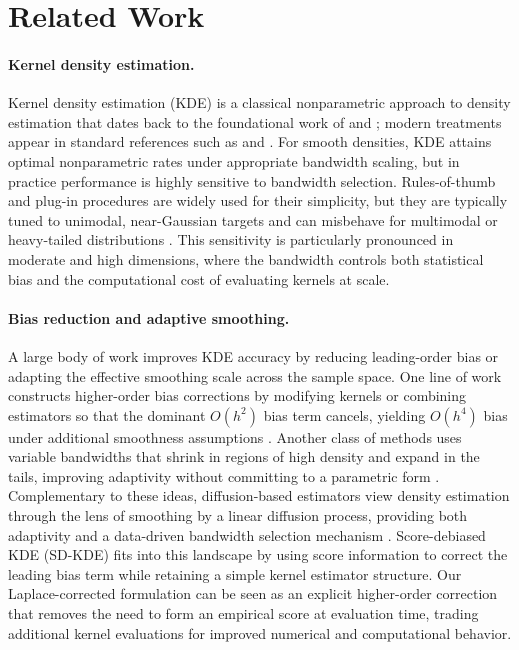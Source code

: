 \section{Related Work}
\label{sec:related}

\paragraph{Kernel density estimation.}
Kernel density estimation (KDE) is a classical nonparametric approach to density estimation that dates back to the foundational work of \citet{rosenblatt1956remarks} and \citet{parzen1962estimation}; modern treatments appear in standard references such as \citet{silverman1986density} and \citet{wand1995kernel}.
For smooth densities, KDE attains optimal nonparametric rates under appropriate bandwidth scaling, but in practice performance is highly sensitive to bandwidth selection.
Rules-of-thumb and plug-in procedures are widely used for their simplicity, but they are typically tuned to unimodal, near-Gaussian targets and can misbehave for multimodal or heavy-tailed distributions \citep{silverman1986density, botev2010diffusion}.
This sensitivity is particularly pronounced in moderate and high dimensions, where the bandwidth controls both statistical bias and the computational cost of evaluating kernels at scale.

\paragraph{Bias reduction and adaptive smoothing.}
A large body of work improves KDE accuracy by reducing leading-order bias or adapting the effective smoothing scale across the sample space.
One line of work constructs higher-order bias corrections by modifying kernels or combining estimators so that the dominant $O(h^2)$ bias term cancels, yielding $O(h^4)$ bias under additional smoothness assumptions \citep{fan1992bias, jones1997comparison}.
Another class of methods uses variable bandwidths that shrink in regions of high density and expand in the tails, improving adaptivity without committing to a parametric form \citep{abramson1982bandwidth, silverman1986density}.
Complementary to these ideas, diffusion-based estimators view density estimation through the lens of smoothing by a linear diffusion process, providing both adaptivity and a data-driven bandwidth selection mechanism \citep{botev2010diffusion}.
Score-debiased KDE (SD-KDE) \citep{epstein2025sdkde} fits into this landscape by using score information to correct the leading bias term while retaining a simple kernel estimator structure.
Our Laplace-corrected formulation can be seen as an explicit higher-order correction that removes the need to form an empirical score at evaluation time, trading additional kernel evaluations for improved numerical and computational behavior.

